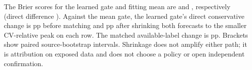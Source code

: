 The Brier scores for the learned gate and fitting mean are
\RefBridgeSupportBrier{} and \RefBridgeMeanBrier{}, respectively
(direct difference \RefBridgeBrierContrast{}). Against the
mean gate, the learned gate's direct conservative change is
\RefBridgeRawContrast{} pp before matching and
\RefBridgeMatchedContrast{} pp after shrinking both forecasts
to the smaller CV-relative peak on each row. The matched
available-label change is \RefBridgeMatchedKnown{} pp. Brackets
show paired source-bootstrap intervals. Shrinkage does not
amplify either path; it is attribution on exposed data and does
not choose a policy or open independent confirmation.
